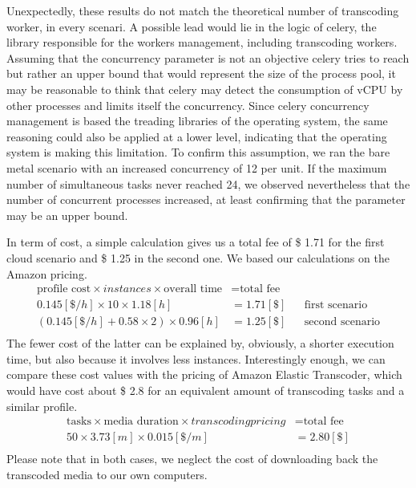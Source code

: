 \documentclass[a4paper, titlepage]{paper}
\numberwithin{figure}{section}
\numberwithin{table}{section}
\begin{document}
      Unexpectedly, these results do not match the theoretical number of transcoding worker, in every scenari. A possible lead would lie in the logic of celery, the library responsible for the workers management, including transcoding workers. Assuming that the concurrency parameter is not an objective celery tries to reach but rather an upper bound that would represent the size of the process pool, it may be reasonable to think that celery may detect the consumption of vCPU by other processes and limits itself the concurrency. Since celery concurrency management is based the treading libraries of the operating system, the same reasoning could also be applied at a lower level, indicating that the operating system is making this limitation. To confirm this assumption, we ran the bare metal scenario with an increased concurrency of 12 per unit. If the maximum number of simultaneous tasks never reached 24, we observed nevertheless that the number of concurrent processes increased, at least confirming that the parameter may be an upper bound.

      In term of cost, a simple calculation gives us a total fee of \$ 1.71 for the first cloud scenario and \$ 1.25 in the second one. We based our calculations on the Amazon pricing.
      \begin{align*}
        \text{profile cost} \times {instances} \times \text{overall time} &= \text{total fee} \\
        0.145[\$/h] \times 10         \times 1.18[h] &= 1.71[\$] && \text{first scenario} \\
        (0.145[\$/h] + 0.58 \times 2) \times 0.96[h] &= 1.25[\$] && \text{second scenario}\\
      \end{align*}
      The fewer cost of the latter can be explained by, obviously, a shorter execution time, but also because it involves less instances. Interestingly enough, we can compare these cost values with the pricing of Amazon Elastic Transcoder, which would have cost about \$ 2.8 for an equivalent amount of transcoding tasks and a similar profile.
      \begin{align*}
        \text{tasks} \times \text{media duration} \times {transcoding pricing} &= \text{total fee} \\
        50 \times 3.73[m] \times 0.015[\$/m] &= 2.80[\$] \\
      \end{align*}
      Please note that in both cases, we neglect the cost of downloading back the transcoded media to our own computers.
\end{document}
